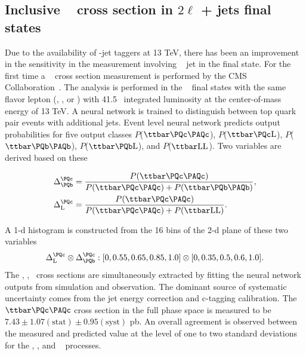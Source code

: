 \subsection{Inclusive \ttcc~ cross section in $2\ell$ + jets final states}
Due to the availability of \PQc-jet taggers at 13 TeV, there has been an improvement in the 
sensitivity in the measurement involving \PQc~ jet in the final state. For the first time a \ttcc~ 
cross section measurement is performed  by the CMS Collaboration~\cite{CMS:2020qvt}. The analysis 
is performed in the \dilep~ final states with the same flavor lepton (\Pe, \Pmu, or \PQtau) 
with 41.5\fbinv~ integrated luminosity at the center-of-mass energy of 13 TeV. A neural network is 
trained to distinguish between top quark pair events with additional jets. Event level neural 
network predicts output probabilities for five output classes $P$($\ttcc$), $P$($\ttcL$), $P$($\ttbb$), $P$($\ttbL$), and $P$($\ttLF$). Two variables are derived based on these
\begin{linenomath}
\begin{equation}
  \begin{aligned}
\Delta_{\PQb}^{\PQc} &= \frac{P(\ttcc) }{P(\ttcc) + P(\ttbb)},\\
\Delta_{\text{L}}^{\PQc} &=  \frac{P(\ttcc)}{P(\ttcc) + P(\ttLF)}.
\label{eq:Dbcdiscriminator}
  \end{aligned}
\end{equation}
\end{linenomath}
A 1-d histogram is constructed from the 16 bins of the 2-d plane of these two variables
\begin{equation}
\Delta_{\text{L}}^{\PQc} \otimes \Delta_{\PQb}^{\PQc} :  [0,0.55,0.65,0.85,1.0] \otimes [0,0.35,0.5,0.6,1.0].
\end{equation}
The \ttcc, \ttbb, \ttLF~cross sections are simultaneously extracted by fitting the neural network
outputs from simulation and observation. The dominant source of systematic uncertainty comes 
from the jet energy correction and c-tagging calibration. The $\ttcc$ cross section in the
full phase space is measured to be $7.43\pm 1.07(\text{stat})\pm 0.95(\text{syst})$ pb. 
An overall agreement is observed between the measured and predicted value at the level of 
one to two standard deviations for the \ttcc, \ttbb, and \ttLF~ processes. 

